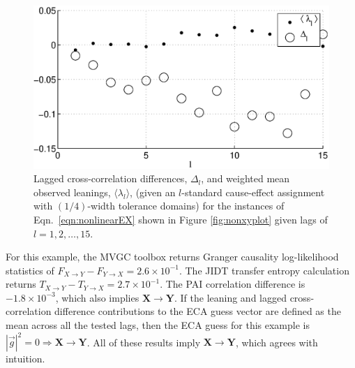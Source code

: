 \documentclass{article}[10pt]
\begin{document}
\begin{figure}[ht]
\begin{center}
\includegraphics[scale=0.7]{NonlinearResponseExample_LandLCC.eps} 
\end{center}
\caption{Lagged cross-correlation differences, $\Delta_l$, and weighted mean observed leanings, $\langle\lambda_l\rangle$, (given an $l$-standard cause-effect assignment with $(1/4)$-width tolerance domains) for the instances of Eqn.\ \ref{eqn:nonlinearEX} shown in Figure \ref{fig:nonxyplot} given lags of $l=1,2,\ldots,15$.}
\label{fig:nonxyLandLCC}
\end{figure}

For this example, the MVGC toolbox returns Granger causality log-likelihood statistics of $F_{X\rightarrow Y}-F_{Y\rightarrow X}=2.6\times 10^{-1}$.  The JIDT transfer entropy calculation returns $T_{X\rightarrow Y}-T_{Y\rightarrow X}=2.7\times 10^{-1}$.  The PAI correlation difference is $-1.8\times 10^{-3}$, which also implies $\mathbf{X}\rightarrow\mathbf{Y}$.  If the leaning and lagged cross-correlation difference contributions to the ECA guess vector are defined as the mean across all the tested lags, then the ECA guess for this example is $|\vec{g}|^2=0\Rightarrow \mathbf{X}\rightarrow\mathbf{Y}$.  All of these results imply $\mathbf{X}\rightarrow\mathbf{Y}$, which agrees with intuition.    
\end{document}
